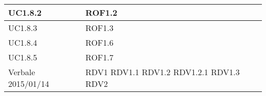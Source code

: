 \begin{center}
\begin{longtable}{| p{4cm} | p{4cm} |}
	\hline
	UC1.8.2  &  ROF1.2 \\
	\hline
	UC1.8.3  &  ROF1.3 \\
	\hline
	UC1.8.4  &  ROF1.6 \\
	\hline
	UC1.8.5  &  ROF1.7 \\
	\hline
	Verbale 2015/01/14  &  RDV1 \newline RDV1.1 \newline RDV1.2 \newline RDV1.2.1 \newline RDV1.3 \newline RDV2 \\
	\hline

\end{longtable}
\egroup
\end{center}

